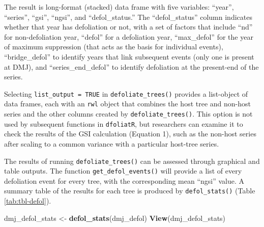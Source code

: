 \documentclass[review]{elsarticle} %
\newenvironment{Shaded}{\begin{snugshade}}{\end{snugshade}}
\newcommand{\KeywordTok}[1]{\textcolor[rgb]{0.13,0.29,0.53}{\textbf{#1}}}
\newcommand{\NormalTok}[1]{#1}
\newcommand{\StringTok}[1]{\textcolor[rgb]{0.31,0.60,0.02}{#1}}
\begin{document}
The result is long-format (stacked) data frame with five variables: ``year'', ``series'', ``gsi'', ``ngsi'', and ``defol\_status.'' The ``defol\_status'' column indicates whether that year has defoliation or not, with a set of factors that include ``nd'' for non-defoliation year, ``defol'' for a defoliation year, ``max\_defol'' for the year of maximum suppression (that acts as the basis for individual events), ``bridge\_defol'' to identify years that link subsequent events (only one is present at DMJ), and ``series\_end\_defol'' to identify defoliation at the present-end of the series.

Selecting \texttt{list\_output\ =\ TRUE} in \texttt{defoliate\_trees()} provides a list-object of data frames, each with an \texttt{rwl} object that combines the host tree and non-host series and the other columns created by \texttt{defoliate\_trees()}. This option is not used by subsequent functions in \texttt{dfoliatR}, but researchers can examine it to check the results of the GSI calculation (Equation 1), such as the non-host series after scaling to a common variance with a particular host-tree series.

The results of running \texttt{defoliate\_trees()} can be assessed through graphical and table outputs. The function \texttt{get\_defol\_events()} will provide a list of every defoliation event for every tree, with the corresponding mean ``ngsi'' value. A summary table of the results for each tree is produced by \texttt{defol\_stats()} (Table \ref{tab:tbl-defol}).

\begin{Shaded}
\begin{Highlighting}[]
\NormalTok{dmj_defol_stats <-}\StringTok{ }\KeywordTok{defol_stats}\NormalTok{(dmj_defol)}
\KeywordTok{View}\NormalTok{(dmj_defol_stats)}
\end{Highlighting}
\end{Shaded}
\end{document}
